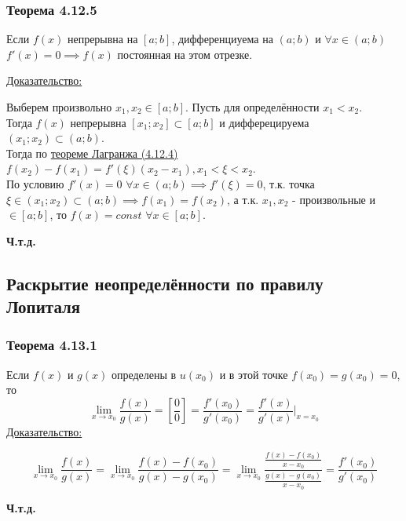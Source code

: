 \documentclass[12pt]{article}
\begin{document}
    \subsubsection*{Теорема 4.12.5}\label{th:4.12.5}
    Если $f(x)$ непрерывна на $[a;b]$, дифференциуема на $(a;b)$ и $\forall x \in (a;b)$ $f'(x) = 0 \implies f(x)$ постоянная на этом отрезке.\par\noindent
    \underline{Доказательство:}
    \begin{adjustwidth}{1.5em}{1.5em}
        Выберем произвольно $x_1, x_2 \in [a; b]$. Пусть для определённости $x_1 < x_2$.\\
        Тогда $f(x)$ непрерывна $[x_1;x_2] \subset [a;b]$ и дифферецируема $(x_1; x_2) \subset (a; b)$.\\
        Тогда по \hyperref[th:4.12.4]{теореме Лагранжа (4.12.4)} $f(x_2) - f(x_1) = f'(\xi)(x_2-x_1), x_1 < \xi < x_2$.\\
        По условию $f'(x) = 0$ $\forall x \in (a; b) \implies f'(\xi) = 0$, т.к. точка $\xi \in (x_1; x_2) \subset (a; b) \implies f(x_1) = f(x_2)$, а т.к. $x_1, x_2$ - произвольные и $\in [a; b]$, то $f(x) = const$ $\forall x \in [a;b]$.
        \begin{center}
            \textbf{Ч.т.д.}
        \end{center}
    \end{adjustwidth}

    \subsection{Раскрытие неопределённости по правилу Лопиталя}
    \subsubsection*{Теорема 4.13.1}\label{th:4.13.1}
    Если $f(x)$ и $g(x)$ определены в $u(x_0)$ и в этой точке $f(x_0) = g(x_0) = 0$, то
    \[ \lim_{x\to x_0}\frac{f(x)}{g(x)} = \left[\frac{0}{0}\right] = \frac{f'(x_0)}{g'(x_0)} = \frac{f'(x)}{g'(x)}\Big|_{x = x_0} \]
    \underline{Доказательство:}
    \begin{adjustwidth}{1.5em}{1.5em}
        \[ \lim_{x \to x_0}\frac{f(x)}{g(x)} = \lim_{x\to x_0}\frac{f(x) - f(x_0)}{g(x) - g(x_0)} = \lim_{x\to x_0} \frac{\frac{f(x)-f(x_0)}{x - x_0}}{\frac{g(x) - g(x_0)}{x - x_0}} = \frac{f'(x_0)}{g'(x_0)} \]
        \begin{center}
            \textbf{Ч.т.д.}
        \end{center}
    \end{adjustwidth}
    
\end{document}
